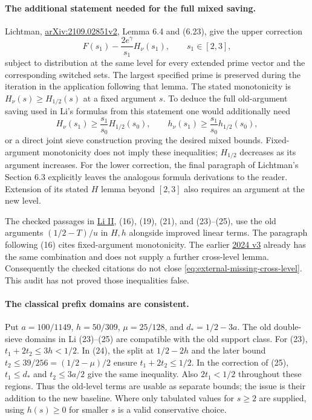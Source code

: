 \documentclass[11pt]{article}
\begin{document}
\paragraph{The additional statement needed for the full mixed saving.}
Lichtman,
\href{https://arxiv.org/html/2109.02851v2}{arXiv:2109.02851v2},
Lemma 6.4 and (6.23), give the upper correction
\[
 F(s_1)-\frac{2e^\gamma}{s_1}H_\nu(s_1),
 \qquad s_1\in[2,3],
\]
subject to distribution at the same level for every extended
prime vector and the corresponding switched sets.
The largest specified prime is preserved during the iteration
in the application following that lemma. The stated monotonicity
is $H_\nu(s)\ge H_{1/2}(s)$ at a fixed argument $s$.
To deduce the full old-argument saving used in Li's formulas
from this statement one would additionally need
\begin{equation}\label{eq:external-missing-cross-level}
 H_\nu(s_1)\ge\frac{s_1}{s_0}H_{1/2}(s_0),
 \qquad
 h_\nu(s_1)\ge\frac{s_1}{s_0}h_{1/2}(s_0),
\end{equation}
or a direct joint sieve construction proving the desired mixed
bounds. Fixed-argument monotonicity does not imply these
inequalities; $H_{1/2}$ decreases as its argument increases.
For the lower correction, the final paragraph of Lichtman's
Section 6.3 explicitly leaves the analogous formula derivations
to the reader. Extension of its stated $H$ lemma beyond $[2,3]$
also requires an argument at the new level.

The checked passages in
\href{https://imar.ro/journals/Mathematical_Reports/Pdfs/2026/1_2/3.pdf}
{Li II}, (16), (19), (21), and (23)--(25), use the old arguments
$(1/2-T)/u$ in $H,h$ alongside improved linear terms. The
paragraph following (16) cites fixed-argument monotonicity.
The earlier \href{https://arxiv.org/html/2405.05727v3}{2024 v3}
already has the same combination and does not supply a further
cross-level lemma. Consequently the checked citations do not
close \eqref{eq:external-missing-cross-level}. This audit has
not proved those inequalities false.

\paragraph{The classical prefix domains are consistent.}
Put $a=100/1149$, $h=50/309$, $\mu=25/128$, and
$d_*=1/2-3a$. The old double-sieve domains in Li (23)--(25)
are compatible with the old support class. For (23),
$t_1+2t_2\le3h<1/2$. In (24), the split at $1/2-2h$
and the later bound $t_2\le39/256=(1/2-\mu)/2$ ensure
$t_1+2t_2\le1/2$. In the correction of (25),
$t_1\le d_*$ and $t_2\le3a/2$ give the same inequality.
Also $2t_1<1/2$ throughout these regions.
Thus the old-level terms are usable as separate bounds;
the issue is their addition to the new baseline.
Where only tabulated values for $s\ge2$ are supplied, using
$h(s)\ge0$ for smaller $s$ is a valid conservative choice.
\end{document}
